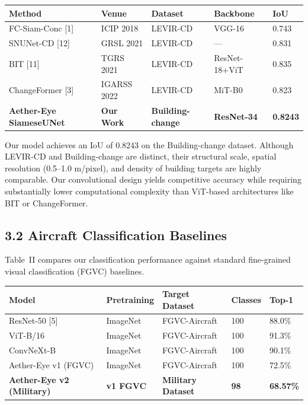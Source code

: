 \documentclass[11pt,a4paper]{article}
\begin{document}
\begin{longtable}[]{@{}lllll@{}}
\toprule\noalign{}
Method & Venue & Dataset & Backbone & IoU \\
\midrule\noalign{}
\endhead
\bottomrule\noalign{}
\endlastfoot
FC-Siam-Conc [1] & ICIP 2018 & LEVIR-CD & VGG-16 & 0.743 \\
SNUNet-CD [12] & GRSL 2021 & LEVIR-CD & --- & 0.831 \\
BIT [11] & TGRS 2021 & LEVIR-CD & ResNet-18+ViT & 0.835 \\
ChangeFormer [3] & IGARSS 2022 & LEVIR-CD & MiT-B0 & 0.823 \\
\textbf{Aether-Eye SiameseUNet} & \textbf{Our Work} & \textbf{Building-change} & \textbf{ResNet-34} & \textbf{0.8243} \\
\end{longtable}

Our model achieves an IoU of 0.8243 on the Building-change dataset. Although LEVIR-CD and Building-change are distinct, their structural scale, spatial resolution (0.5--1.0 m/pixel), and density of building targets are highly comparable. Our convolutional design yields competitive accuracy while requiring substantially lower computational complexity than ViT-based architectures like BIT or ChangeFormer.

\hypertarget{aircraft-classification-baselines}{%
\subsection{3.2 Aircraft Classification Baselines}\label{aircraft-classification-baselines}}

Table~II compares our classification performance against standard fine-grained visual classification (FGVC) baselines.

\begin{longtable}[]{@{}lllll@{}}
\toprule\noalign{}
Model & Pretraining & Target Dataset & Classes & Top-1 \\
\midrule\noalign{}
\endhead
\bottomrule\noalign{}
\endlastfoot
ResNet-50 [5] & ImageNet & FGVC-Aircraft & 100 & 88.0\% \\
ViT-B/16 & ImageNet & FGVC-Aircraft & 100 & 91.3\% \\
ConvNeXt-B & ImageNet & FGVC-Aircraft & 100 & 90.1\% \\
Aether-Eye v1 (FGVC) & ImageNet & FGVC-Aircraft & 100 & 72.5\% \\
\textbf{Aether-Eye v2 (Military)} & \textbf{v1 FGVC} & \textbf{Military Dataset} & \textbf{98} & \textbf{68.57\%} \\
\end{longtable}
\end{document}
